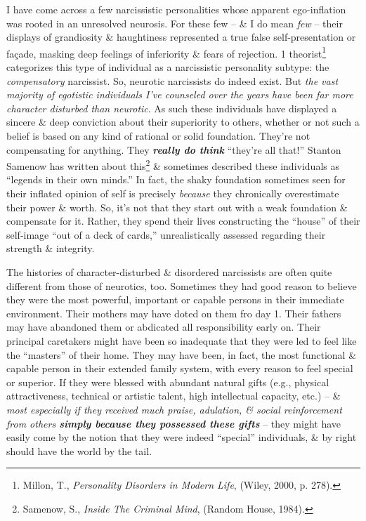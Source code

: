 \documentclass{article}
\numberwithin{equation}{section}
\begin{document}
I have come across a few narcissistic personalities whose apparent ego-inflation was rooted in an unresolved neurosis. For these few -- \& I do mean \textit{few} -- their displays of grandiosity \& haughtiness represented a true false self-presentation or fa\c{c}ade, masking deep feelings of inferiority \& fears of rejection. 1 theorist\footnote{Millon, T., \textit{Personality Disorders in Modern Life}, (Wiley, 2000, p. 278).} categorizes this type of individual as a narcissistic personality subtype: the \textit{compensatory} narcissist. So, neurotic narcissists do indeed exist. But \textit{the vast majority of egotistic individuals I've counseled over the years have been far more character disturbed than neurotic}. As such these individuals have displayed a sincere \& deep conviction about their superiority to others, whether or not such a belief is based on any kind of rational or solid foundation. They're not compensating for anything. They \textbf{\textit{really do think}} ``they're all that!'' Stanton Samenow has written about this\footnote{Samenow, S., \textit{Inside The Criminal Mind}, (Random House, 1984).} \& sometimes described these individuals as ``legends in their own minds.'' In fact, the shaky foundation sometimes seen for their inflated opinion of self is precisely \textit{because} they chronically overestimate their power \& worth. So, it's not that they start out with a weak foundation \& compensate for it. Rather, they spend their lives constructing the ``house'' of their self-image ``out of a deck of cards,'' unrealistically assessed regarding their strength \& integrity.

The histories of character-disturbed \& disordered narcissists are often quite different from those of neurotics, too. Sometimes they had good reason to believe they were the most powerful, important or capable persons in their immediate environment. Their mothers may have doted on them fro day 1. Their fathers may have abandoned them or abdicated all responsibility early on. Their principal caretakers might have been so inadequate that they were led to feel like the ``masters'' of their home. They may have been, in fact, the most functional \& capable person in their extended family system, with every reason to feel special or superior. If they were blessed with abundant natural gifts (e.g., physical attractiveness, technical or artistic talent, high intellectual capacity, etc.) -- \& \textit{most especially if they received much praise, adulation, \& social reinforcement from others \textbf{simply because they possessed these gifts}} -- they might have easily come by the notion that they were indeed ``special'' individuals, \& by right should have the world by the tail.
\end{document}
